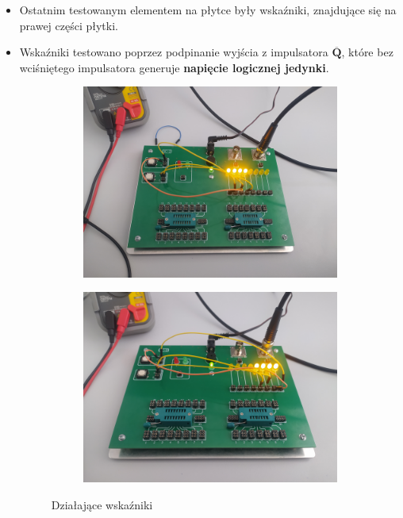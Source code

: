 \begin{itemize}
    \item Ostatnim testowanym elementem na płytce były wskaźniki, znajdujące się na prawej części płytki.
    \item Wskaźniki testowano poprzez podpinanie wyjścia z impulsatora $\overline{\textbf{Q}}$, które bez wciśniętego impulsatora generuje \textbf{napięcie logicznej jedynki}.
        \begin{figure}[H]
            \centering
                \begin{subfigure}[h]{0.4\textwidth}
                    \includegraphics[width=\textwidth]{img/test_plytka/1652306732937_scaled.png}
                \end{subfigure}
                \begin{subfigure}[h]{0.4\textwidth}
                    \includegraphics[width=\textwidth]{img/test_plytka/1652306732913_scaled.png}
                \end{subfigure}
            \caption{Działające wskaźniki}
            \label{płytka:test_wskaźników}
        \end{figure}
\end{itemize}

